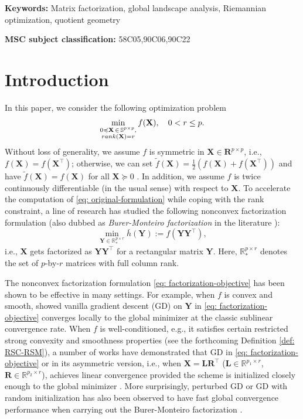 \documentclass[11pt]{article}
\newcommand{\bbR}{\mathbb{R}}
\newcommand{\bbS}{\mathbb{S}}
\newcommand{\0}{{\mathbf{0}}}
\newcommand{\1}{{\mathbf{1}}}
\newcommand{\X}{{\mathbf{X}}}
\newcommand{\R}{{\mathbf{R}}}
\renewcommand{\L}{{\mathbf{L}}}
\newcommand{\Y}{{\mathbf{Y}}}
\newcommand{\rank}{{\rm rank}}
\begin{document}
{\bf Keywords:} Matrix factorization, global landscape analysis, Riemannian optimization, quotient geometry

{\bf MSC subject classification:} 58C05,90C06,90C22

\section{Introduction}
In this paper, we consider the following optimization problem 
\begin{equation} \label{eq: original-formulation}
	\min_{ \substack{  0  \preccurlyeq  \X \, \in  \, \bbS^{p \times p} , \\ \rank(\X) = r }} f(\X), \quad 0 < r \leq p.
\end{equation} Without loss of generality, we assume $f$ is symmetric in $\X \in \R^{p\times p}$, i.e., $f(\X) = f(\X^\top)$; otherwise, we can set $\tilde{f}(\X) = \frac{1}{2}(f(\X) + f(\X^\top)) $ and have $\tilde{f}(\X) = f(\X)$ for all $\X \succcurlyeq 0 $ \cite{bhojanapalli2016dropping}. In addition, we assume $f$ is twice continuously differentiable (in the usual sense) with respect to $\X$. To accelerate the computation of \eqref{eq: original-formulation} while coping with the rank constraint, a line of research has studied the following nonconvex factorization formulation (also dubbed as {\it Burer-Monteiro factorization} in the literature \cite{burer2005local}):
\begin{equation} \label{eq: factorization-objective}
	\min_{\Y \in \bbR^{p \times r}_*} \bar{h} (\Y) := f(\Y \Y^\top),
\end{equation}
i.e., $\X$ gets factorized as $\Y\Y^\top$ for a rectangular matrix $\Y$. Here,  $\bbR^{p \times r}_*$ denotes the set of $p$-by-$r$ matrices with full column rank.

The nonconvex factorization formulation \eqref{eq: factorization-objective} has been shown to be effective in many settings. For example, when $f$ is convex and smooth, \cite{bhojanapalli2016dropping} showed vanilla gradient descent (GD) on $\Y$ in \eqref{eq: factorization-objective} converges locally to the global minimizer at the classic sublinear convergence rate. When $f$ is well-conditioned, e.g., it satisfies certain restricted strong convexity and smoothness properties (see the forthcoming Definition \ref{def: RSC-RSM}), a number of works have demonstrated that GD in \eqref{eq: factorization-objective} or in its asymmetric version, i.e., when $\X = \L \R^\top$ ($\L \in \bbR^{p_1 \times r}$, $\R \in \bbR^{p_2 \times r}$), achieves linear convergence provided the scheme is initialized closely enough to the global minimizer \cite{bhojanapalli2016dropping,chen2015fast,candes2015phase,li2019rapid,ma2019implicit,sun2015guaranteed,tu2016low,charisopoulos2021low,zhao2015nonconvex,zheng2015convergent,ding2020leave,tong2020accelerating}. More surprisingly, perturbed GD or GD with random initialization has also been observed to have fast global convergence performance when carrying out the Burer-Monteiro factorization \cite{bi2022local,chen2019gradient,ye2021global}. 
\end{document}
